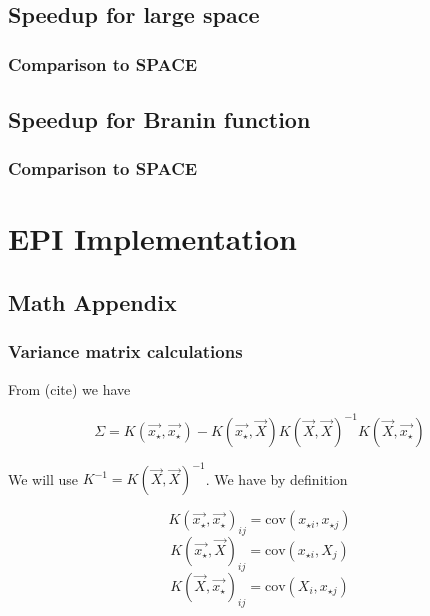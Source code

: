 \documentclass[phd,tocprelim]{cornell}
\begin{document}
\section{Speedup for large space}

\subsection{Comparison to SPACE}

\section{Speedup for Branin function}

\subsection{Comparison to SPACE}


\chapter{EPI Implementation} %
\label{cha:EPI Implementation}

\section{Math Appendix}

\subsection{Variance matrix calculations}

From (cite) we have

\begin{equation}
 \Sigma = K(\vec{x_{\star}}, \vec{x_{\star}}) - K(\vec{x_{\star}}, \vec{X}) K(\vec{X}, \vec{X})^{-1} K(\vec{X}, \vec{x_{\star}})
\end{equation}

We will use $K^{-1} = K(\vec{X}, \vec{X})^{-1}$. We have by definition

\begin{equation}
 K(\vec{x_{\star}}, \vec{x_{\star}})_{ij} = \mbox{cov}(x_{\star i}, x_{\star j})
\end{equation}
\begin{equation}
 K(\vec{x_{\star}}, \vec{X})_{ij} = \mbox{cov}(x_{\star i}, X_{j})
\end{equation}
\begin{equation}
 K(\vec{X}, \vec{x_{\star}})_{ij} = \mbox{cov}(X_{i}, x_{\star j})
\end{equation}
\end{document}

